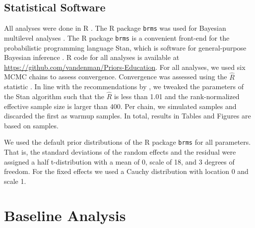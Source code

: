 \documentclass[a4paper]{article}
\newcommand{\getValInt}[3]{%
	\pgfplotstablegetelem{#1}{#2}\of{#3}%
	\pgfmathprintnumber[fixed, fixed zerofill=false]{\pgfplotsretval}%
}
\newcommand{\code}[1]{\texttt{#1}}
\newcommand{\githubLink}{\url{https://github.com/vandenman/Priors-Education}}
\begin{document}
\subsection*{Statistical Software}
\tbMCMCsettings

All analyses were done in R \cite{R}.
The R package \code{brms} was used for Bayesian multilevel analyses \cite{burkner2017brms}.
The R package \code{brms} is a convenient front-end for the probabilistic programming language Stan, which is software for general-purpose Bayesian inference \cite{carpenter2017stan}.
R code for all analyses is available at \githubLink{}.
For all analyses, we used six MCMC chains to assess convergence.
Convergence was assessed using the $\widehat{R}$ statistic \cite{vehtari2019rank}.
In line with the recommendations by , we tweaked the parameters of the Stan algorithm such that the $\widehat{R}$ is less than 1.01 and the rank-normalized effective sample size is larger than 400.
Per chain, we simulated \getValInt{0}{iter}{\tbMCMCsettings} samples and discarded the first \getValInt{0}{warmup}{\tbMCMCsettings} as warmup samples.
In total, results in Tables and Figures are based on \getValInt{0}{total}{\tbMCMCsettings} samples.

We used the default prior distributions of the R package \code{brms} for all parameters. That is, the standard deviations of the random effects and the residual were assigned a half t-distribution with a mean of 0, scale of 18, and 3 degrees of freedom. For the fixed effects we used a Cauchy distribution with location 0 and scale 1.

\section*{Baseline Analysis}

\tbPostSummaryBaseline
\end{document}
